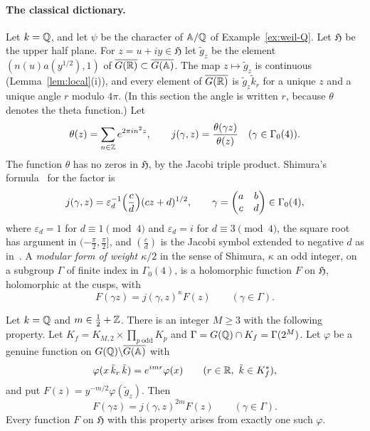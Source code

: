 \paragraph{The classical dictionary.} Let $k=\mathbb{Q}$, and let $\psi$ be the
character of $\mathbb{A}/\mathbb{Q}$ of Example~\ref{ex:weil-Q}. Let $\mathfrak H$ be the
upper half plane. For $z=u+iy\in\mathfrak H$ let $\tilde g_z$ be the
element $(n(u)a(y^{1/2}),1)$ of $\overline{G(\mathbb{R})}\subset\overline{G(\mathbb{A})}$.
The map $z\mapsto\tilde g_z$ is continuous (Lemma~\ref{lem:local}(i)), and
every element of $\overline{G(\mathbb{R})}$ is $\tilde g_z\tilde k_r$ for a
unique $z$ and a unique angle $r$ modulo $4\pi$. (In this section the
angle is written $r$, because $\theta$ denotes the theta function.) Let
\[
\theta(z)=\sum_{n\in\mathbb{Z}}e^{2\pi in^2z},\qquad
j(\gamma,z)=\frac{\theta(\gamma z)}{\theta(z)}\quad(\gamma\in\Gamma_0(4)).
\]
The function $\theta$ has no zeros in $\mathfrak H$, by the Jacobi
triple product. Shimura's formula~\cite{Sh73} for the factor is
\begin{equation}\label{eq:shimura-j}
j(\gamma,z)=\varepsilon_d^{-1}\Bigl(\frac cd\Bigr)(cz+d)^{1/2},\qquad
\gamma=\begin{pmatrix}a&b\\c&d\end{pmatrix}\in\Gamma_0(4),
\end{equation}
where $\varepsilon_d=1$ for $d\equiv1\pmod4$ and $\varepsilon_d=i$ for
$d\equiv3\pmod4$, the square root has argument in $(-\frac\pi2,
\frac\pi2]$, and $(\frac cd)$ is the Jacobi symbol extended to negative
$d$ as in~\cite{Sh73}. A \emph{modular form of weight $\kappa/2$} in the
sense of Shimura, $\kappa$ an odd integer, on a subgroup $\Gamma$ of
finite index in $\Gamma_0(4)$, is a holomorphic function $F$ on
$\mathfrak H$, holomorphic at the cusps, with
\[
F(\gamma z)=j(\gamma,z)^\kappa F(z)\qquad(\gamma\in\Gamma).
\]

\begin{lemma}\label{lem:classical}
Let $k=\mathbb{Q}$ and $m\in\frac12+\mathbb{Z}$. There is an integer $M\ge3$ with the
following property. Let $K_f=K_{M,2}\times\prod_{p\ \mathrm{odd}}K_p$ and
$\Gamma=G(\mathbb{Q})\cap K_f=\Gamma(2^M)$. Let $\varphi$ be a genuine function
on $G(\mathbb{Q})\backslash\overline{G(\mathbb{A})}$ with
\[
\varphi(x\,\tilde k_r\,\tilde k)=e^{imr}\varphi(x)\qquad(r
\in\mathbb{R},\ \tilde k\in K_f^*),
\]
and put $F(z)=y^{-m/2}\varphi(\tilde g_z)$. Then
\[
F(\gamma z)=j(\gamma,z)^{2m}F(z)\qquad(\gamma\in\Gamma).
\]
Every function $F$ on $\mathfrak H$ with this property arises from
exactly one such $\varphi$.
\end{lemma}


